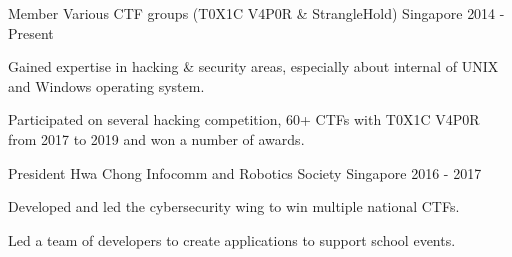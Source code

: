 

\begin{cventries}

  \cventry
    {Member} %
    {Various CTF groups (T0X1C V4P0R \& StrangleHold)} %
    {Singapore} %
    {2014 - Present} %
    {
      \begin{cvitems} %
        \item {Gained expertise in hacking \& security areas, especially about internal of UNIX and Windows operating system.}
        \item {Participated on several hacking competition, 60+ CTFs with T0X1C V4P0R from 2017 to 2019 and won a number of awards.}
      \end{cvitems}
    }

  \cventry
    {President} %
    {Hwa Chong Infocomm and Robotics Society} %
    {Singapore} %
    {2016 - 2017} %
    {
      \begin{cvitems} %
        \item {Developed and led the cybersecurity wing to win multiple national CTFs.}
        \item {Led a team of developers to create applications to support school events.}
      \end{cvitems}
    }

\end{cventries}
